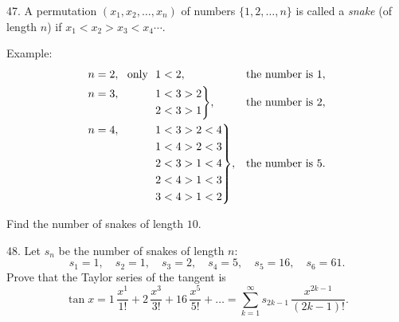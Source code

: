 \begin{problem}{47.}
A permutation $(x_1,x_2, \dotsc,x_n)$ of numbers $\{1, 2, \dotsc, n\}$ is called a
\emph{snake} (of length $n$) if $x_1<x_2>x_3<x_4 \dotsb$.

\begin{note}{Example:}
	\begin{equation*}
		\begin{aligned}[t]
			 & \begin{aligned}[t] n=2, \text{\ \ only\ \ } 1<2, \end{aligned}                                                &                         & \text{the number is }1,   \\
			 & \hskip-\nulldelimiterspace\mathord{\left.\begin{aligned} n=3, \hphantom{\text{\ \ only\ \ }} 1 & <3>2 \\
                2                                     & <3>1\end{aligned} \right\}},   &                         & \text{the number is }2, \\
			 & \hskip-\nulldelimiterspace\mathord{\left.\begin{aligned} n=4, \hphantom{\text{\ \ only\ \ }} 1 & <3>2<4 \\
                1                                     & <4>2<3 \\
                2                                     & <3>1<4 \\
                2                                     & <4>1<3 \\
                3                                     & <4>1<2\end{aligned} \right\}},
			 &                                                                                                               & \text{the number is }5.                             \\
		\end{aligned}
	\end{equation*}
\end{note}
Find the number of snakes of length $10$.
\end{problem}

\begin{problem}{48.}
Let $s_n$ be the number of snakes of length $n$:
\begin{equation*}
	s_1=1, \quad s_2=1, \quad s_3=2, \quad s_4=5, \quad s_5=16, \quad s_6=61.
\end{equation*}
Prove that the Taylor series of the tangent is
\begin{equation*}
	\tan x=1\, \frac{x^1}{1!}+2\, \frac{x^3}{3!}+16\, \frac{x^5}{5!}+\dots=
	\textstyle\sum\limits_{k=1}^{\infty} s_{2k-1}\, \frac{x^{2k-1}}{(2k-1)!}.
\end{equation*}
\end{problem}

